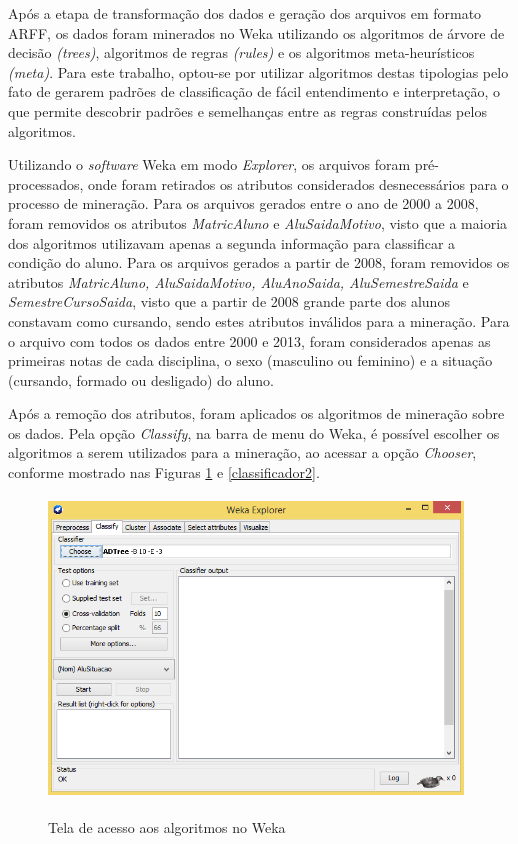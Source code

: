 Após a etapa de transformação dos dados e geração dos arquivos em formato ARFF, os dados foram minerados no Weka utilizando os algoritmos de árvore de decisão \textit{(trees)}, algoritmos de regras \textit{(rules)} e os algoritmos meta-heurísticos \textit{(meta)}. Para este trabalho, optou-se por utilizar algoritmos destas tipologias pelo fato de gerarem padrões de classificação de fácil entendimento e interpretação, o que permite descobrir padrões e semelhanças entre as regras construídas pelos algoritmos.

Utilizando o \textit{software} Weka em modo \textit{Explorer}, os arquivos foram pré-processados, onde foram retirados os atributos considerados desnecessários para o processo de mineração. Para os arquivos gerados entre o ano de 2000 a 2008, foram removidos os atributos \textit{MatricAluno} e \textit{AluSaidaMotivo}, visto que a maioria dos algoritmos utilizavam apenas a segunda informação para classificar a condição do aluno. Para os arquivos gerados a partir de 2008, foram removidos os atributos \textit{MatricAluno, AluSaidaMotivo, AluAnoSaida, AluSemestreSaida} e \textit{SemestreCursoSaida}, visto que a partir de 2008 grande parte dos alunos constavam como cursando, sendo estes atributos inválidos para a mineração. Para o arquivo com todos os dados entre 2000 e 2013, foram considerados apenas as primeiras notas de cada disciplina, o sexo (masculino ou feminino) e a situação (cursando, formado ou desligado) do aluno.

Após a remoção dos atributos, foram aplicados os algoritmos de mineração sobre os dados. Pela opção \textit{Classify}, na barra de menu do Weka, é possível escolher os algoritmos a serem utilizados para a mineração, ao acessar a opção \textit{Chooser}, conforme mostrado nas Figuras \ref{classificador} e \ref{classificador2}.

   \begin{figure}[!h]
   	\centering
   	{\includegraphics[width=11cm, height=8cm]{images/classificador}}
   	\caption {Tela de acesso aos algoritmos no Weka}
   	\label{classificador}
   \end{figure}
   
